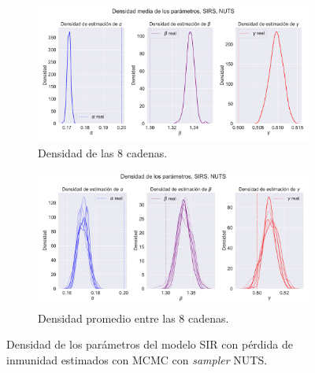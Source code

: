 \begin{figure}[h]
    \centering
    \begin{subfigure}[b]{\linewidth}
        \centering
        \includegraphics[width=0.55\linewidth]{img/content/chapter4/NUTS_sirs_params_density.pdf}
        \caption{Densidad de las 8 cadenas.}
    \end{subfigure}
     \begin{subfigure}[b]{\linewidth}
        \centering
        \includegraphics[width=0.55\linewidth]{img/content/chapter4/NUTS_sirs_params_density_mean.pdf}
        \caption{Densidad promedio entre las 8 cadenas.}
    \end{subfigure}
    \caption{Densidad de los parámetros del modelo SIR con pérdida de inmunidad estimados con MCMC con \textit{sampler} NUTS.}
\end{figure}

